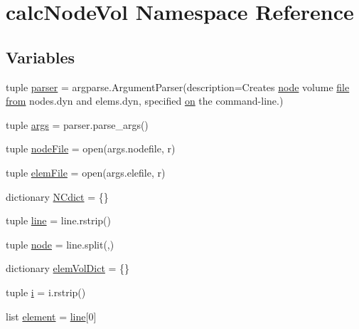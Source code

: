 \hypertarget{namespacecalcNodeVol}{}\section{calc\+Node\+Vol Namespace Reference}
\label{namespacecalcNodeVol}
\subsection*{Variables}
\begin{DoxyCompactItemize}
\item 
tuple \hyperlink{namespacecalcNodeVol_ac609e0d497500657ae472a13c3bcad73}{parser} = argparse.\+Argument\+Parser(description=\textquotesingle{}Creates \hyperlink{namespacecalcNodeVol_a9ea89ae9b0c2f371d156b0ae2aeeb273}{node} volume \hyperlink{field2dyna_8m_a42bb321d7af345108bd7e04e4fea2f8f}{file} \hyperlink{field2dyna_8m_a4c59e51b61bbb48762ded4f701681494}{from} nodes.\+dyn and elems.\+dyn, specified \hyperlink{makeLoadsTemps_8m_a58ab1fd68e97078232808206b850161b}{on} the command-\/line.\textquotesingle{})
\item 
tuple \hyperlink{namespacecalcNodeVol_ad8e8c17c49f462bf19254dd620483ca4}{args} = parser.\+parse\+\_\+args()
\item 
tuple \hyperlink{namespacecalcNodeVol_a86debe38847ec21b83c2ff90bb216cc7}{node\+File} = open(args.\+nodefile, \textquotesingle{}r\textquotesingle{})
\item 
tuple \hyperlink{namespacecalcNodeVol_a0ba6213bb93ac529e94dce28a5f6c356}{elem\+File} = open(args.\+elefile, \textquotesingle{}r\textquotesingle{})
\item 
dictionary \hyperlink{namespacecalcNodeVol_a44bfcb22d05381f9c292a4a34c7d9acf}{N\+Cdict} = \{\}
\item 
tuple \hyperlink{namespacecalcNodeVol_ab892d7af59cf1ab14d8c73aea66077d0}{line} = line.\+rstrip()
\item 
tuple \hyperlink{namespacecalcNodeVol_a9ea89ae9b0c2f371d156b0ae2aeeb273}{node} = line.\+split(\textquotesingle{},\textquotesingle{})
\item 
dictionary \hyperlink{namespacecalcNodeVol_a8c3ec1be52f16fe4948bb7b04a910616}{elem\+Vol\+Dict} = \{\}
\item 
tuple \hyperlink{namespacecalcNodeVol_a64c45dcfc518f39eea16b41d63476c80}{i} = i.\+rstrip()
\item 
list \hyperlink{namespacecalcNodeVol_acb063a8c5b2a22cd96a1962924082680}{element} = \hyperlink{namespacecalcNodeVol_ab892d7af59cf1ab14d8c73aea66077d0}{line}\mbox{[}0\mbox{]}

\end{DoxyCompactItemize}
